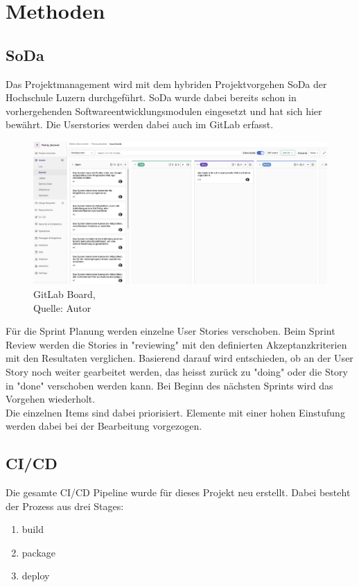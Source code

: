 \section{Methoden}
\subsection{\gls{SoDa}}
Das Projektmanagement wird mit dem hybriden Projektvorgehen \gls{SoDa} der Hochschule Luzern durchgeführt. 
SoDa wurde dabei bereits schon in vorhergehenden Softwareentwicklungsmodulen eingesetzt und hat sich hier bewährt. Die Userstories werden dabei auch im \gls{GitLab} erfasst.  
\begin{figure}[H]
	\centering
	\includegraphics[width=1\textwidth]{images/boardGitlab.png}
	\caption[GitLab Board]{GitLab Board,\\ Quelle: Autor}
	\label{img: GitlLabBoard}
\end{figure}
Für die Sprint Planung werden einzelne User Stories verschoben. Beim Sprint Review werden die Stories in "reviewing" mit den definierten Akzeptanzkriterien mit den Resultaten verglichen. Basierend darauf wird entschieden, ob an der \gls{User Story} noch weiter gearbeitet werden, das heisst zurück zu "doing" oder die Story in "done" verschoben werden kann. Bei Beginn des nächsten Sprints wird das Vorgehen wiederholt. \\
Die einzelnen Items sind dabei priorisiert. Elemente mit einer hohen Einstufung werden dabei bei der Bearbeitung vorgezogen. 

\subsection{CI/CD}
Die gesamte \ac{CI/CD} Pipeline wurde für dieses Projekt neu erstellt. Dabei besteht der Prozess aus drei Stages: 
\begin{enumerate}
	\item build
	\item package
	\item deploy
\end{enumerate}

